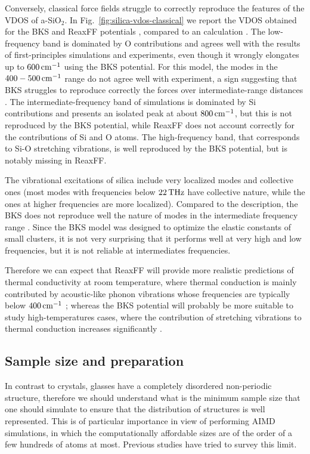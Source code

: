 Conversely, classical force fields struggle to correctly reproduce the features of the VDOS of a-SiO$_2$. In Fig.~\ref{fig:silica-vdos-classical} we report the VDOS obtained for the BKS and ReaxFF potentials \cite{Tian2017}, compared to an \abinitio calculation \cite{Bhattarai2016}. 
The low-frequency band is dominated by O contributions and agrees well with the results of first-principles simulations and experiments, even though it wrongly elongates up to $600\,\mathrm{cm^{-1}}$ using the BKS potential. For this model, the modes in the $400-500\,\mathrm{cm^{-1}}$ range do not agree well with experiment, a sign suggesting that BKS struggles to reproduce correctly the forces over intermediate-range distances \cite{Vollmayr1996,Benoit2002}. 
The intermediate-frequency band of \abinitio simulations is dominated by Si contributions and presents an isolated peak at about $800\,\mathrm{cm^{-1}}$, but this is not reproduced by the BKS potential, while ReaxFF does not account correctly for the contributions of Si and O atoms. 
The high-frequency band, that corresponds to Si-O stretching vibrations, is well reproduced by the BKS potential, but is notably missing in ReaxFF. 

The vibrational excitations of silica include very localized modes and collective ones (most modes with frequencies below $22\,\mathrm{THz}$ have  collective nature, while the ones at higher frequencies are more localized). Compared to the \abinitio description, the BKS does not reproduce well the nature of modes in the intermediate frequency range \cite{Benoit2002}. Since the BKS model was designed to optimize the elastic constants of small clusters, it is not very surprising that it performs well at very high and low frequencies, but it is not reliable at intermediates frequencies. 

Therefore we can expect that ReaxFF will provide more realistic predictions of thermal conductivity at room temperature, where thermal conduction is mainly contributed by acoustic-like phonon vibrations whose frequencies are typically below $400\,\mathrm{cm^{-1}}$ \cite{Bhattarai2016}; whereas the BKS potential will probably be more suitable to study high-temperatures cases, where the contribution of stretching vibrations to thermal conduction increases significantly \cite{Tian2017}. 



\subsection{Sample size and preparation}  \label{sec:glass-size}
In contrast to crystals, glasses have a completely disordered non-periodic structure, therefore we should understand what is the minimum sample size that one should simulate to ensure that the distribution of structures is well represented. This is of particular importance in view of performing AIMD simulations, in which the computationally affordable sizes are of the order of a few hundreds of atoms at most. Previous studies have tried to survey this limit. 

